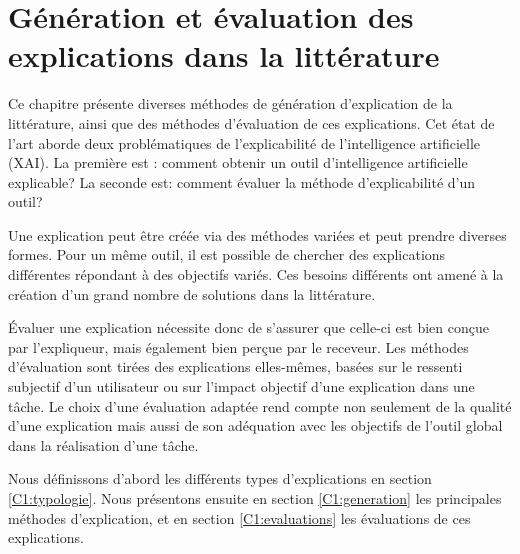 \chapter[Génération et évaluation des explications dans la littérature]{Génération et évaluation des explications dans la littérature} \label{C1}

Ce chapitre présente diverses méthodes de génération d'explication de la littérature, ainsi que des méthodes d'évaluation de ces explications. Cet état de l'art aborde deux problématiques de l'explicabilité de l'intelligence artificielle (XAI). La première est : comment obtenir un outil d'intelligence artificielle explicable? La seconde est: comment évaluer la méthode d'explicabilité d'un outil?

Une explication peut être créée via des méthodes variées et peut prendre diverses formes. Pour un même outil, il est possible de chercher des explications différentes répondant à des objectifs variés. Ces besoins différents ont amené à la création d'un grand nombre de solutions dans la littérature.

\'Evaluer une explication nécessite donc de s'assurer que celle-ci est bien conçue par l'expliqueur, mais également bien perçue par le receveur.
Les méthodes d'évaluation sont tirées des explications elles-mêmes, basées sur le ressenti subjectif d'un utilisateur ou sur l'impact objectif d'une explication dans une tâche. Le choix d'une évaluation adaptée rend compte non seulement de la qualité d'une explication mais aussi de son adéquation avec les objectifs de l'outil global dans la réalisation d'une tâche.

Nous définissons d'abord les différents types d'explications en section \ref{C1:typologie}.
Nous présentons ensuite en section \ref{C1:generation} les principales méthodes d'explication, et en section \ref{C1:evaluations} les évaluations de ces explications.


